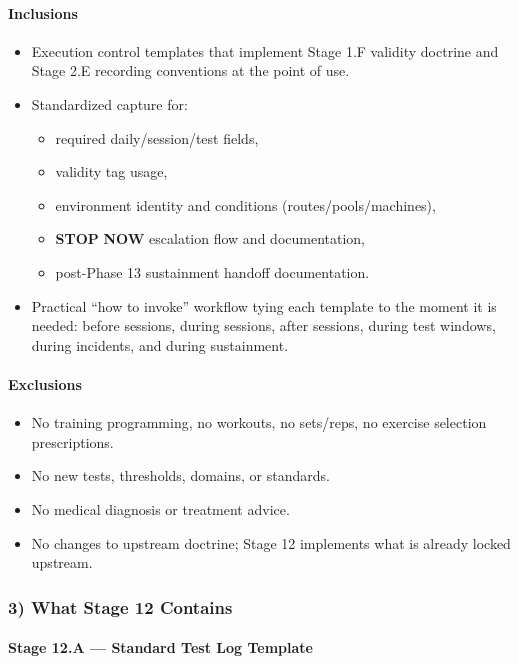 \documentclass[10pt]{article}
\begin{document}
\paragraph*{Inclusions}

\begin{itemize}
\item Execution control templates that implement Stage 1.F validity doctrine and Stage 2.E recording conventions at the point of use.
\item Standardized capture for:
  \begin{itemize}
  \item required daily/session/test fields,
  \item validity tag usage,
  \item environment identity and conditions (routes/pools/machines),
  \item \textbf{STOP} \textbf{NOW} escalation flow and documentation,
  \item post-Phase 13 sustainment handoff documentation.
  \end{itemize}
\item Practical “how to invoke” workflow tying each template to the moment it is needed: before sessions, during sessions, after sessions, during test windows, during incidents, and during sustainment.
\end{itemize}

\paragraph*{Exclusions}

\begin{itemize}
\item No training programming, no workouts, no sets/reps, no exercise selection prescriptions.
\item No new tests, thresholds, domains, or standards.
\item No medical diagnosis or treatment advice.
\item No changes to upstream doctrine; Stage 12 implements what is already locked upstream.
\end{itemize}

\subsubsection*{3) What Stage 12 Contains}

\paragraph*{Stage 12.A — Standard Test Log Template}
\end{document}
